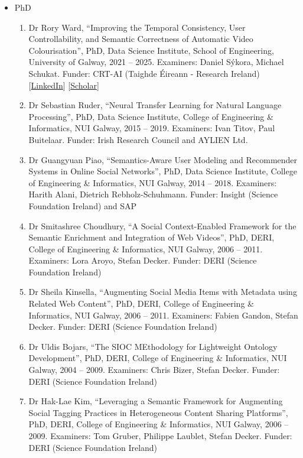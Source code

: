 \documentclass[10pt,a4paper]{res} %
\begin{document}
\begin{resume}
\begin{itemize} \itemsep -2pt
\item PhD
\begin{enumerate} \itemsep -2pt
\item Dr Rory Ward, ``Improving the Temporal Consistency, User Controllability, and Semantic Correctness of Automatic Video Colourisation'', PhD, Data Science Institute, School of Engineering, University of Galway, 2021 -- 2025. Examiners: Daniel S\'{y}kora, Michael Schukat. Funder: CRT-AI (Taighde \'{E}ireann - Research Ireland) 
[\href{https://www.linkedin.com/in/rory-ward-b2a758307/}{LinkedIn}]
[\href{https://scholar.google.com.eg/citations?hl=en&user=6q_LxhAAAAAJ}{Scholar}] %
\item Dr Sebastian Ruder, ``Neural Transfer Learning for Natural Language Processing'', PhD, Data Science Institute, College of Engineering \& Informatics, NUI Galway, 2015 -- 2019. Examiners: Ivan Titov, Paul Buitelaar. Funder: Irish Research Council and AYLIEN Ltd. %
\item Dr Guangyuan Piao, ``Semantics-Aware User Modeling and Recommender Systems in Online Social Networks'', PhD, Data Science Institute, College of Engineering \& Informatics, NUI Galway, 2014 -- 2018. Examiners: Harith Alani, Dietrich Rebholz-Schuhmann. Funder: Insight (Science Foundation Ireland) and SAP %
\item Dr Smitashree Choudhury, ``A Social Context-Enabled Framework for the Semantic Enrichment and Integration of Web Videos'', PhD, DERI, College of Engineering \& Informatics, NUI Galway, 2006 -- 2011. Examiners: Lora Aroyo, Stefan Decker. Funder: DERI (Science Foundation Ireland) %
\item Dr Sheila Kinsella, ``Augmenting Social Media Items with Metadata using Related Web Content'', PhD, DERI, College of Engineering \& Informatics, NUI Galway, 2006 -- 2011. Examiners: Fabien Gandon, Stefan Decker. Funder: DERI (Science Foundation Ireland) %
\item Dr Uldis Bojars, ``The SIOC MEthodology for Lightweight Ontology Development'', PhD, DERI, College of Engineering \& Informatics, NUI Galway, 2004 -- 2009. Examiners: Chris Bizer, Stefan Decker. Funder: DERI (Science Foundation Ireland) %
\item Dr Hak-Lae Kim, ``Leveraging a Semantic Framework for Augmenting Social Tagging Practices in Heterogeneous Content Sharing Platforms'', PhD, DERI, College of Engineering \& Informatics, NUI Galway, 2006 -- 2009. Examiners: Tom Gruber, Philippe Laublet, Stefan Decker. Funder: DERI (Science Foundation Ireland) %

\end{enumerate}
\end{itemize}
\end{resume}
\end{document}
